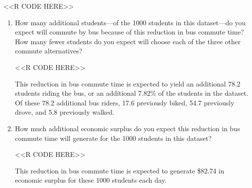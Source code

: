 \documentclass[11pt,letterpaper]{article}
\begin{document}
\begin{enumerate}[label=\alph*., leftmargin=*]
	<<R CODE HERE>>

	\begin{enumerate}[label=\roman*.]
		\item How many additional students---of the 1000 students in this dataset---do you expect will commute by bus because of this reduction in bus commute time? How many fewer students do you expect will choose each of the three other commute alternatives?

		<<R CODE HERE>>

		This reduction in bus commute time is expected to yield an additional 78.2 students riding the bus, or an additional 7.82\% of the students in the dataset. Of these 78.2 additional bus riders, 17.6 previously biked, 54.7 previously drove, and 5.8 previously walked.

		\item How much additional economic surplus do you expect this reduction in bus commute time will generate for the 1000 students in this dataset?

		<<R CODE HERE>>

		This reduction in bus commute time is expected to generate \$82.74 in economic surplus for these 1000 students each day.
	\end{enumerate}
\end{enumerate}
\end{document}
